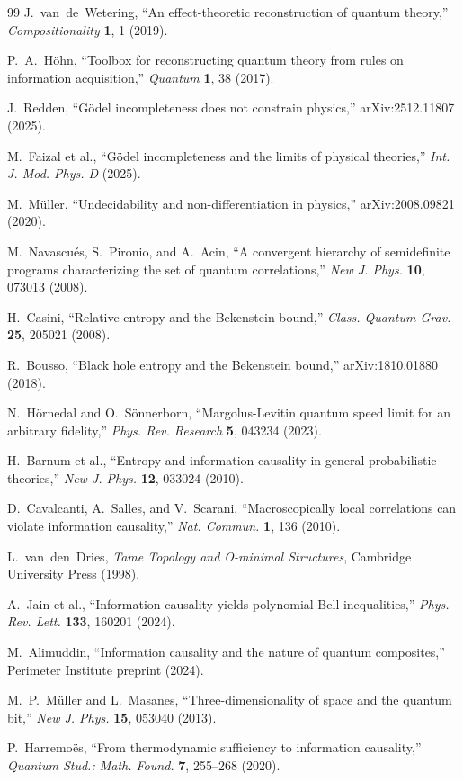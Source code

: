 \documentclass[12pt,a4paper]{article}
\theoremstyle{definition}
\theoremstyle{remark}
\begin{document}
\begin{thebibliography}{99}
J.~van~de~Wetering, ``An effect-theoretic reconstruction of quantum theory,'' \textit{Compositionality} \textbf{1}, 1 (2019).

P.~A.~H\"ohn, ``Toolbox for reconstructing quantum theory from rules on information acquisition,'' \textit{Quantum} \textbf{1}, 38 (2017).

J.~Redden, ``G\"odel incompleteness does not constrain physics,'' arXiv:2512.11807 (2025).

M.~Faizal et al., ``G\"odel incompleteness and the limits of physical theories,'' \textit{Int. J. Mod. Phys. D} (2025).

M.~M\"uller, ``Undecidability and non-differentiation in physics,'' arXiv:2008.09821 (2020).

M.~Navascu\'es, S.~Pironio, and A.~Acin, ``A convergent hierarchy of semidefinite programs characterizing the set of quantum correlations,'' \textit{New J. Phys.} \textbf{10}, 073013 (2008).

H.~Casini, ``Relative entropy and the Bekenstein bound,'' \textit{Class. Quantum Grav.} \textbf{25}, 205021 (2008).

R.~Bousso, ``Black hole entropy and the Bekenstein bound,'' arXiv:1810.01880 (2018).

N.~H\"ornedal and O.~S\"onnerborn, ``Margolus-Levitin quantum speed limit for an arbitrary fidelity,'' \textit{Phys. Rev. Research} \textbf{5}, 043234 (2023).

H.~Barnum et al., ``Entropy and information causality in general probabilistic theories,'' \textit{New J. Phys.} \textbf{12}, 033024 (2010).

D.~Cavalcanti, A.~Salles, and V.~Scarani, ``Macroscopically local correlations can violate information causality,'' \textit{Nat. Commun.} \textbf{1}, 136 (2010).

L.~van~den~Dries, \textit{Tame Topology and O-minimal Structures}, Cambridge University Press (1998).

A.~Jain et al., ``Information causality yields polynomial Bell inequalities,'' \textit{Phys. Rev. Lett.} \textbf{133}, 160201 (2024).

M.~Alimuddin, ``Information causality and the nature of quantum composites,'' Perimeter Institute preprint (2024).

M.~P.~M\"uller and L.~Masanes, ``Three-dimensionality of space and the quantum bit,'' \textit{New J. Phys.} \textbf{15}, 053040 (2013).

P.~Harremo\"es, ``From thermodynamic sufficiency to information causality,'' \textit{Quantum Stud.: Math. Found.} \textbf{7}, 255--268 (2020).

\end{thebibliography}
\end{document}
